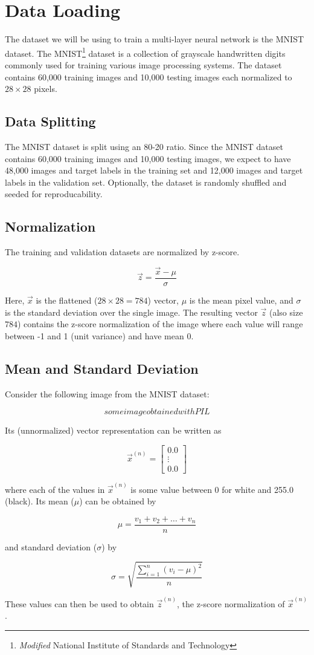 \section{Data Loading}
The dataset we will be using to train a multi-layer neural network is the
MNIST dataset. The {MNIST}\footnote{\textit{Modified} National Institute of
	Standards and Technology} dataset is a collection of grayscale handwritten
digits commonly used for training various image processing systems. The dataset
contains 60,000 training images and 10,000 testing images each normalized to $28
	\times 28$ pixels.

\subsection{Data Splitting}
The MNIST dataset is split using an 80-20 ratio. Since the MNIST dataset
contains 60,000 training images and 10,000 testing images, we expect to have
48,000 images and target labels in the training set and 12,000 images and
target labels in the validation set. Optionally, the dataset is randomly
shuffled and seeded for reproducability.

\subsection{Normalization}
The training and validation datasets are normalized by z-score.

$$ \vec{z} = \frac{\vec{x} - \mu}{\sigma} $$

Here, $\vec{x}$ is the flattened ($ 28 \times 28 = 784$) vector, $\mu$ is
the mean pixel value, and $\sigma$ is the standard deviation over the single
image. The resulting vector $\vec{z}$ (also size $784$) contains the z-score
normalization of the image where each value will range between -1 and 1 (unit
variance) and have mean 0.

\subsection{Mean and Standard Deviation}
Consider the following image from the MNIST dataset:

$$ some image obtained with PIL $$

Its (unnormalized) vector representation can be written as

$$ \vec{x}^{(n)}  =
	\begin{bmatrix}
		0.0    \\
		\vdots \\
		0.0
	\end{bmatrix}
$$

where each of the values in $\vec{x}^{(n)}$ is some value between 0 for white and
255.0 (black). Its mean ($\mu$) can be obtained by

$$ \mu = \frac{v_1 + v_2 + \ldots + v_n}{n} $$

and standard deviation ($\sigma$) by

$$ \sigma = \sqrt{\frac{\sum_{i=1}^{n} (v_i - \mu)^2}{n}} $$

These values can then be used to obtain $\vec{z}^{(n)}$, the z-score
normalization of $\vec{x}^{(n)}$.
